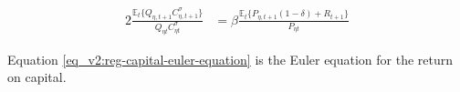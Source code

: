 \documentclass[../thesis.tex]{subfiles}
\begin{document}
\begin{alignat}{2}
	\frac{\mathbb{E}_{t} \{ Q_{\eta,t+1} C_{\eta,t+1}^{\sigma} \} }{ Q_{\eta t} C_{\eta t}^{\sigma} } &= \beta \frac{ \mathbb{E}_{t} \{ P_{\eta,t+1} (1 - \delta) + R_{t+1} \} }{P_{\eta t}} \label{eq_v2:reg-capital-euler-equation}
\end{alignat}

Equation \ref{eq_v2:reg-capital-euler-equation} is the Euler equation for the return on capital.

\begin{comment}

	Divide \ref{eq_v2:reg-capital-euler-equation} of region one by region two:
\begin{alignat}{2}
	\frac{\mathbb{E}_{t} \left\{Q_{1, t+1} C_{1, t+1}^{\sigma} \right\}}{\mathbb{E}_{t} \left\{Q_{2, t+1} C_{2, t+1}^{\sigma} \right\}} &= \frac{\beta (1 + R_{t}) Q_{1t} C_{1t}^{\sigma}}{\beta (1 + R_{t}) Q_{2t} C_{2t}^{\sigma}} \implies \nonumber \\
	\frac{\mathbb{E}_{t} \left\{ Q_{1, t+1} C_{1, t+1}^{\sigma} \right\}}{Q_{1t} C_{1t}^{\sigma}} &= \frac{\mathbb{E}_{t} \left\{ Q_{2, t+1} C_{2, t+1}^{\sigma} \right\}}{Q_{2t} C_{2t}^{\sigma}} \label{eq_v2:reg-bonds-euler-equation-2}
\end{alignat}
	
\end{comment}


\begin{comment}

	Define the regional consumer inflation gross rate:
	\begin{align}
		\pi_{\eta t} &= \frac{Q_{\eta t}}{Q_{\eta, t-1}} \label{eq_v2:consumer-inflation}
	\end{align}

	The relation between the nominal $R_{t}$ and the real $r_{t}$ interest rates is the gross inflation rate $\pi_{t}$, given by the Fisher equation. %
	\begin{align}
		\pi_{t} = \frac{(1 + R_{t})}{(1 + r_{t})}  \label{eq_v2:fisher-equation}
	\end{align}
	
\end{comment}


\end{document}
